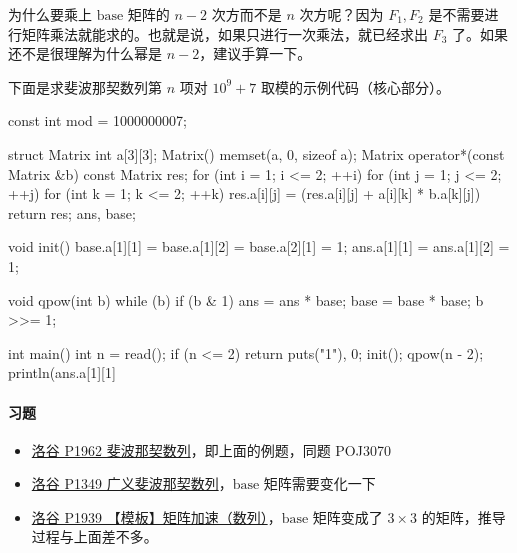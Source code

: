 为什么要乘上 $\text{base}$ 矩阵的 $n-2$ 次方而不是 $n$ 次方呢？因为 $F_1, F_2$ 是不需要进行矩阵乘法就能求的。也就是说，如果只进行一次乘法，就已经求出 $F_3$ 了。如果还不是很理解为什么幂是 $n-2$，建议手算一下。

下面是求斐波那契数列第 $n$ 项对 $10^9+7$ 取模的示例代码（核心部分）。

\begin{cppcode}
const int mod = 1000000007;

struct Matrix {
  int a[3][3];
  Matrix() { memset(a, 0, sizeof a); }
  Matrix operator*(const Matrix &b) const {
    Matrix res;
    for (int i = 1; i <= 2; ++i)
      for (int j = 1; j <= 2; ++j)
        for (int k = 1; k <= 2; ++k)
          res.a[i][j] = (res.a[i][j] + a[i][k] * b.a[k][j]) %
    return res;
  }
} ans, base;

void init() {
  base.a[1][1] = base.a[1][2] = base.a[2][1] = 1;
  ans.a[1][1] = ans.a[1][2] = 1;
}

void qpow(int b) {
  while (b) {
    if (b & 1) ans = ans * base;
    base = base * base;
    b >>= 1;
  }
}

int main() {
  int n = read();
  if (n <= 2) return puts("1"), 0;
  init();
  qpow(n - 2);
  println(ans.a[1][1] %
}
\end{cppcode}

\paragraph{习题}

\begin{itemize}
\item \href{https://www.luogu.org/problemnew/show/P1962}{洛谷 P1962 斐波那契数列}，即上面的例题，同题 POJ3070
\item \href{https://www.luogu.org/problemnew/show/P1349}{洛谷 P1349 广义斐波那契数列}，$\text{base}$ 矩阵需要变化一下
\item \href{https://www.luogu.org/problemnew/show/P1939}{洛谷 P1939 【模板】矩阵加速（数列）}，$\text{base}$ 矩阵变成了 $3 \times 3$ 的矩阵，推导过程与上面差不多。
\end{itemize}
